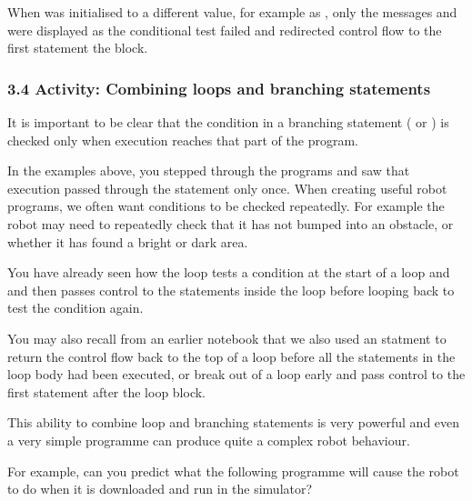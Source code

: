 \documentclass[letterpaper,10pt,english]{sphinxmanual}
\begin{document}
{When  was initialised to a different value, for example as , only the messages  and  were displayed as the  conditional test failed and redirected control flow to the first statement  the  block.


\subsubsection{3.4 Activity: Combining loops and branching statements}
\label{\detokenize{content/02_Robot_Lab/Section_00_02:3.4-Activity:-Combining-loops-and-branching-statements}}
It is important to be clear that the condition in a branching statement ( or ) is checked only when execution reaches that part of the program.

In the examples above, you stepped through the programs and saw that execution passed through the  statement only once. When creating useful robot programs, we often want conditions to be checked repeatedly. For example the robot may need to repeatedly check that it has not bumped into an obstacle, or whether it has found a bright or dark area.

You have already seen how the  loop tests a condition at the start of a loop and and then passes control to the statements inside the loop before looping back to test the  condition again.

You may also recall from an earlier notebook that we also used an  statment to return the control flow back to the top of a loop before all the statements in the loop body had been executed, or break out of a loop early and pass control to the first statement after the loop block.

This ability to combine loop and branching statements is very powerful and even a very simple programme can produce quite a complex robot behaviour.

For example, can you predict what the following programme will cause the robot to do when it is downloaded and run in the simulator?


}
\end{document}
